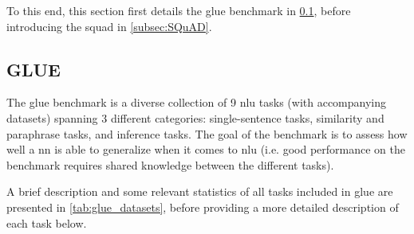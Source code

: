 To this end, this section first details the \gls{glue} benchmark in \cref{subsec:GLUE}, before introducing the \gls{squad} in \cref{subsec:SQuAD}.


\subsection{GLUE}
\label{subsec:GLUE}
The \gls{glue} benchmark \citep{wang2018glue} is a diverse collection of 9 \gls{nlu} tasks (with accompanying datasets) spanning 3 different categories: single-sentence tasks, similarity and paraphrase tasks, and inference tasks. The goal of the benchmark is to assess how well a \gls{nn} is able to generalize when it comes to \gls{nlu} (i.e. good performance on the benchmark requires shared knowledge between the different tasks).

A brief description and some relevant statistics of all tasks included in \gls{glue} are presented in \cref{tab:glue_datasets}, before providing a more detailed description of each task below.

